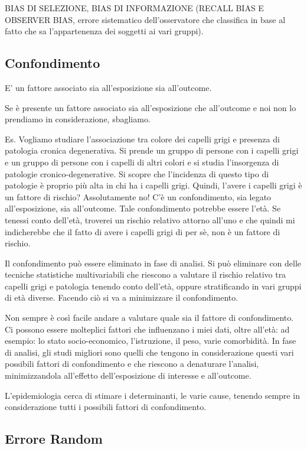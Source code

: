 BIAS DI SELEZIONE, BIAS DI INFORMAZIONE (RECALL BIAS E OBSERVER BIAS,
errore sistematico dell'osservatore che classifica in base al fatto che
sa l'appartenenza dei soggetti ai vari gruppi).

\subsection{Confondimento}

E' un fattore associato sia all'esposizione sia all'outcome.

Se è presente un fattore associato sia all'esposizione che all'outcome e
noi non lo prendiamo in considerazione, sbagliamo.

Es. Vogliamo studiare l'associazione tra colore dei capelli grigi e
presenza di patologia cronica degenerativa. Si prende un gruppo di
persone con i capelli grigi e un gruppo di persone con i capelli di
altri colori e si studia l'insorgenza di patologie cronico-degenerative.
Si scopre che l'incidenza di questo tipo di patologie è proprio più alta
in chi ha i capelli grigi. Quindi, l'avere i capelli grigi è un fattore
di rischio? Assolutamente no! C'è un confondimento, sia legato
all'esposizione, sia all'outcome. Tale confondimento potrebbe essere
l'età. Se tenessi conto dell'età, troverei un rischio relativo attorno
all'uno e che quindi mi indicherebbe che il fatto di avere i capelli
grigi di per sè, non è un fattore di rischio.

Il confondimento può essere eliminato in fase di analisi. Si può
eliminare con delle tecniche statistiche multivariabili che riescono a
valutare il rischio relativo tra capelli grigi e patologia tenendo conto
dell'età, oppure stratificando in vari gruppi di età diverse. Facendo
ciò si va a minimizzare il confondimento.

Non sempre è così facile andare a valutare quale sia il fattore di
confondimento. Ci possono essere molteplici fattori che influenzano i
miei dati, oltre all'età: ad esempio: lo stato socio-economico,
l'istruzione, il peso, varie comorbidità. In fase di analisi, gli studi
migliori sono quelli che tengono in considerazione questi vari possibili
fattori di confondimento e che riescono a denaturare l'analisi,
minimizzandola all'effetto dell'esposizione di interesse e all'outcome.

L'epidemiologia cerca di stimare i determinanti, le varie cause, tenendo
sempre in considerazione tutti i possibili fattori di confondimento.

\subsection{Errore Random}


